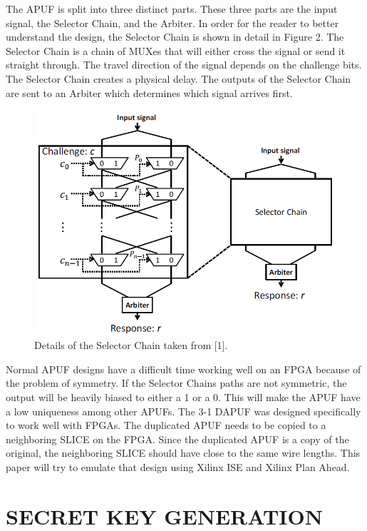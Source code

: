 \documentclass[letterpaper, 10 pt, conference]{ieeeconf}  %
\begin{document}
The APUF is split into three distinct parts.  These three parts are the input signal, the Selector Chain, and the Arbiter.  In order for the reader to better understand the design, the Selector Chain is shown in detail in Figure 2.  The Selector Chain is a chain of MUXes that will either cross the signal or send it straight through.  The travel direction of the signal depends on the challenge bits.  The Selector Chain creates a physical delay.  The outputs of the Selector Chain are sent to an Arbiter which determines which signal arrives first.

\begin{figure}[thpb]
	\centering
	\includegraphics[scale=.42]{Chain}
   \caption{Details of the Selector Chain taken from [1].}
\end{figure}

Normal APUF designs have a difficult time working well on an FPGA because of the problem of symmetry. If the Selector Chains paths are not symmetric, the output will be heavily biased to either a 1 or a 0.  This will make the APUF have a low uniqueness among other APUFs.  The 3-1 DAPUF was designed specifically to work well with FPGAs.  The duplicated APUF needs to be copied to a neighboring SLICE on the FPGA.  Since the duplicated APUF is a copy of the original, the neighboring SLICE should have close to the same wire lengths.  This paper will try to emulate that design using Xilinx ISE and Xilinx Plan Ahead.

\section{SECRET KEY GENERATION}
\end{document}
